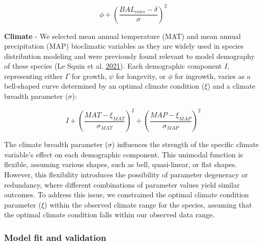 \documentclass[12pt]{article}
\begin{document}
\begin{equation}
  \phi + \left(\frac{BAL_{cons} - \delta}{\sigma}\right)^2
\label{eq:compingrowth}\end{equation}

\textbf{Climate} - We selected mean annual temperature (MAT) and mean
annual precipitation (MAP) bioclimatic variables as they are widely used
in species distribution modeling and were previously found relevant to
model demography of these species (Le Squin et al.
\protect\hyperlink{ref-LeSquin2021}{2021}). Each demographic component
\(I\), representing either \(\Gamma\) for growth, \(\psi\) for
longevity, or \(\phi\) for ingrowth, varies as a bell-shaped curve
determined by an optimal climate condition (\(\xi\)) and a climate
breadth parameter (\(\sigma\)):

\begin{equation}
  I + \left(\frac{MAT - \xi_{MAT}}{\sigma_{MAT}}\right)^2 + \left(\frac{MAP - \xi_{MAP}}{\sigma_{MAP}}\right)^2
\label{eq:compEffect}\end{equation}

The climate breadth parameter (\(\sigma\)) influences the strength of
the specific climate variable's effect on each demographic component.
This unimodal function is flexible, assuming various shapes, such as
bell, quasi-linear, or flat shapes. However, this flexibility introduces
the possibility of parameter degeneracy or redundancy, where different
combinations of parameter values yield similar outcomes. To address this
issue, we constrained the optimal climate condition parameter (\(\xi\))
within the observed climate range for the species, assuming that the
optimal climate condition falls within our observed data range.

\hypertarget{model-fit-and-validation}{%
\subsubsection{Model fit and
validation}\label{model-fit-and-validation}}
\end{document}
